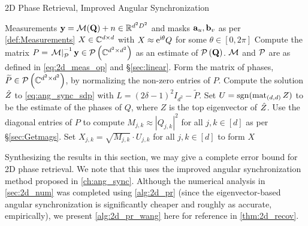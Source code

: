 \begin{algorithm}[htbp]
\renewcommand{\algorithmicrequire}{\textbf{Input:}}
\renewcommand{\algorithmicensure}{\textbf{Output:}}
\caption{2D Phase Retrieval, Improved Angular Synchronization}
\label{alg:2d_pr_wang}
\begin{algorithmic}[1]
    \REQUIRE Measurements $\mathbf y = \mathcal{M}(\mathbf{Q}) + n \in \mathbb{R}^{d^2 D^2}$ and masks $\mathbf a_u, \mathbf b_v$ as per \eqref{def:Measurements}
    \ENSURE $X \in \mathbb{C}^{d \times d}$ with $X \approx \mathrm{e}^{\mathrm{i} \theta} Q$ for some $\theta \in [0, 2 \pi]$ 
    \STATE Compute the matrix $P = \left.\mathcal{M}\right|_{\mathcal{P}}^{-1} {\bf y} \in \mathcal{P}\left(\mathbb{C}^{d^2\times d^2}\right)$ as an estimate of $\mathcal{P} \left( \mathbf{Q} \right)$.  $\mathcal{M}$ and $\mathcal{P}$ are as defined in \eqref{eq:2d_meas_op} and \S\ref{sec:linear}.
    \STATE Form the matrix of phases, $\widetilde{P} \in \mathcal{P}\left(\mathbb{C}^{d^2\times d^2}\right)$, by normalizing the non-zero entries of $P$.
    \STATE Compute the solution $\hat{Z}$ to \eqref{eq:ang_sync_sdp} with $L = (2 \delta - 1)^2 I_{d^2} - \widetilde{P}$.  Set $U = \operatorname{sgn}(\operatorname{mat}_{(d, d)} Z)$ to be the estimate of the phases of $Q$, where $Z$ is the top eigenvector of $\hat{Z}$.
    \STATE Use the diagonal entries of $P$ to compute $M_{j,k} \approx \left| Q_{j,k} \right|^2$ for all $j,k \in [d]$ as per \S\ref{sec:Getmags}.
    \STATE Set $X_{j,k} = \sqrt{M_{j,k}} \cdot U_{j,k}$ for all $j,k \in [d]$ to form $X$
    \end{algorithmic}
\end{algorithm}

Synthesizing the results in this section, we may give a complete error bound for 2D phase retrieval.  We note that this uses the improved angular synchronization method proposed in \cref{ch:ang_sync}.  Although the numerical analysis in \cref{sec:2d_num} was completed using \cref{alg:2d_pr} (since the eigenvector-based angular synchronization is significantly cheaper and roughly as accurate, empirically), we present \cref{alg:2d_pr_wang} here for reference in \cref{thm:2d_recov}.

